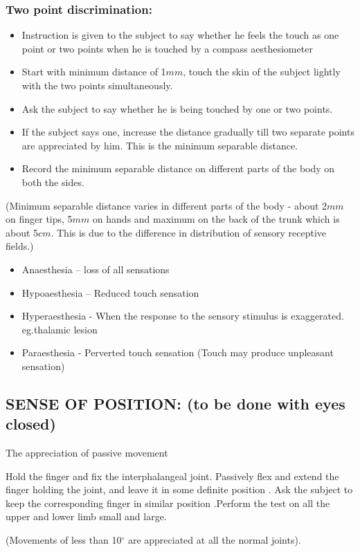 \documentclass[a4paper,12pt]{book}
\begin{document}
\subsubsection*{Two point discrimination:}
\begin{itemize}
\item{Instruction is given to the subject to say whether he feels the touch as one point or two points when he is touched by a compass aesthesiometer}
\item{Start with minimum distance of 1$mm$, touch the skin of the subject lightly with the two points simultaneously.}
\item{Ask the subject to say whether he is being touched by one or two points.}
\item{If the subject says one, increase the distance gradually till two separate points are appreciated by him. This is the minimum separable distance.}
\item{Record the minimum separable distance on different parts of the body on both the sides.}
\end{itemize}
\par
(Minimum separable distance varies in different parts of the body - about 2$mm$ on finger tips, 5$mm$ on hands and maximum on the back of the trunk which is about 5$cm$. This is due to the difference in distribution of sensory receptive fields.)
\begin{itemize}
\item[]Anaesthesia 	– loss of all sensations
\item[]Hypoaesthesia 	– Reduced touch sensation
\item[]Hyperaesthesia 	- When the response to the sensory stimulus is exaggerated.  eg.thalamic lesion
\item[]Paraesthesia 	- Perverted touch sensation (Touch may produce unpleasant 				sensation)
\end{itemize}

\subsection*{SENSE OF POSITION: (to be done with eyes closed)}
\par
The appreciation of passive movement
\par
	Hold the finger and fix the interphalangeal joint. Passively flex and extend the finger holding the joint, and leave it in some definite position . Ask the subject to keep the corresponding finger in similar position .Perform the test on all the upper and lower limb small and large.
	\par
(Movements of less than 10${^\circ}$ are appreciated at all the normal joints).
\end{document}
